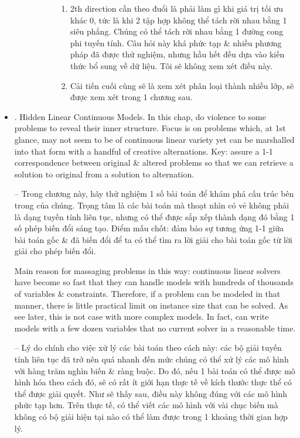 \documentclass{article}
\begin{document}
\begin{itemize}
\begin{itemize}
\begin{itemize}
\begin{itemize}
\begin{enumerate}
                    \item 2th direction cần theo đuổi là phải làm gì khi giá trị tối ưu khác 0, tức là khi 2 tập hợp không thể tách rời nhau bằng 1 siêu phẳng. Chúng có thể tách rời nhau bằng 1 đường cong phi tuyến tính. Câu hỏi này khá phức tạp \& nhiều phương pháp đã được thử nghiệm, nhưng hầu hết đều dựa vào kiến thức bổ sung về dữ liệu. Tôi sẽ không xem xét điều này.
                    \item Cải tiến cuối cùng sẽ là xem xét phân loại thành nhiều lớp, sẽ được xem xét trong 1 chương sau.
                \end{enumerate}
            \end{itemize}
        \end{itemize}
    \end{itemize}
    \item {. Hidden Linear Continuous Models.} In this chap, do violence to some problems to reveal their inner structure. Focus is on problems which, at 1st glance, may not seem to be of continuous linear variety yet can be marshalled into that form with a handful of creative alternations. Key: assure a 1-1 correspondence between original \& altered problems so that we can retrieve a solution to original from a solution to alternation.

    -- Trong chương này, hãy thử nghiệm 1 số bài toán để khám phá cấu trúc bên trong của chúng. Trọng tâm là các bài toán mà thoạt nhìn có vẻ không phải là dạng tuyến tính liên tục, nhưng có thể được sắp xếp thành dạng đó bằng 1 số phép biến đổi sáng tạo. Điểm mấu chốt: đảm bảo sự tương ứng 1-1 giữa bài toán gốc \& đã biến đổi để ta có thể tìm ra lời giải cho bài toán gốc từ lời giải cho phép biến đổi.

    Main reason for massaging problems in this way: continuous linear solvers have become so fast that they can handle models with hundreds of thousands of variables \& constraints. Therefore, if a problem can be modeled in that manner, there is little practical limit on instance size that can be solved. As see later, this is not case with more complex models. In fact, can write models with a few dozen variables that no current solver in a reasonable time.

    -- Lý do chính cho việc xử lý các bài toán theo cách này: các bộ giải tuyến tính liên tục đã trở nên quá nhanh đến mức chúng có thể xử lý các mô hình với hàng trăm nghìn biến \& ràng buộc. Do đó, nếu 1 bài toán có thể được mô hình hóa theo cách đó, sẽ có rất ít giới hạn thực tế về kích thước thực thể có thể được giải quyết. Như sẽ thấy sau, điều này không đúng với các mô hình phức tạp hơn. Trên thực tế, có thể viết các mô hình với vài chục biến mà không có bộ giải hiện tại nào có thể làm được trong 1 khoảng thời gian hợp lý.


\end{itemize}
\end{document}

